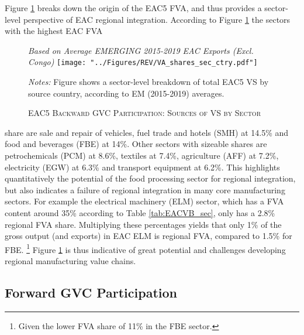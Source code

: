 \documentclass[a4paper]{article}
\begin{document}
 Figure \ref{fig:EACVB_ctry_sec} breaks down the origin of the EAC5 FVA, and thus provides a sector-level perspective of EAC regional integration. According to Figure \ref{fig:EACVB_ctry_sec} the sectors with the highest EAC FVA

\begin{figure}[h!] \vspace{-2mm}
\centering
\caption{\label{fig:EACVB_ctry_sec}\textsc{EAC5 Backward GVC Participation: Sources of VS by Sector}}
\small{\textit{Based on Average EMERGING 2015-2019 EAC Exports (Excl. Congo)}}
\vspace{2mm}
\texttt{[image: "../Figures/REV/VA\_shares\_sec\_ctry.pdf"]} \\ %
\raggedright
\scriptsize
\vspace{-3mm}
\emph{Notes:} Figure shows a sector-level breakdown of total EAC5 VS by source country, according to EM (2015-2019) averages. \\ \vspace{-10mm}
\end{figure}
\FloatBarrier 
\noindent share are sale and repair of vehicles, fuel trade and hotels (SMH) at 14.5\% and food and beverages (FBE) at 14\%. Other sectors with sizeable shares are petrochemicals (PCM) at 8.6\%, textiles at 7.4\%, agriculture (AFF) at 7.2\%, electricity (EGW) at 6.3\% and transport equipment at 6.2\%. This highlights quantitatively the potential of the food processing sector for regional integration, but also indicates a failure of regional integration in many core manufacturing sectors. For example the electrical machinery (ELM) sector, which has a FVA content around 35\% according to Table \ref{tab:EACVB_sec}, only has a 2.8\% regional FVA share. Multiplying these percentages yields that only 1\% of the gross output (and exports) in EAC ELM is regional FVA, compared to 1.5\% for FBE. \footnote{Given the lower FVA share of 11\% in the FBE sector.} Figure \ref{fig:EACVB_ctry_sec} is thus indicative of great potential and challenges developing regional manufacturing value chains. 



\subsection{Forward GVC Participation}
\end{document}
